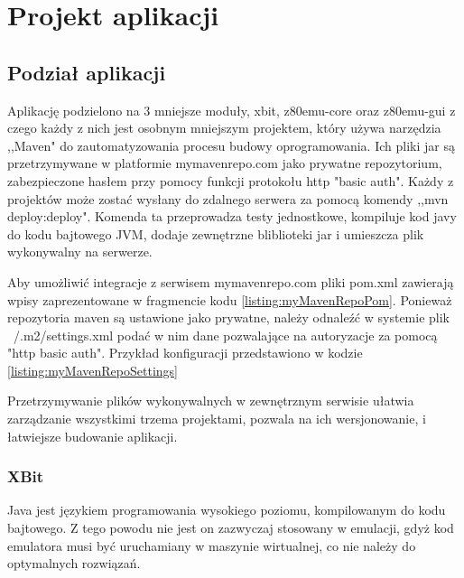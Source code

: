 \chapter{Projekt aplikacji}
	
	\section{Podział aplikacji}
	Aplikację podzielono na 3 mniejsze moduły, xbit, z80emu-core oraz z80emu-gui z czego każdy z nich jest osobnym mniejszym projektem, który używa narzędzia ,,Maven" do zautomatyzowania procesu budowy oprogramowania. Ich pliki jar są przetrzymywane w platformie mymavenrepo.com jako prywatne repozytorium, zabezpieczone hasłem przy pomocy funkcji protokołu http "basic auth". Każdy z projektów może zostać wysłany do zdalnego serwera za pomocą komendy ,,mvn deploy:deploy". Komenda ta przeprowadza testy jednostkowe, kompiluje kod javy do kodu bajtowego JVM, dodaje zewnętrzne bliblioteki jar i umieszcza plik wykonywalny na serwerze.
	
	Aby umożliwić integracje z serwisem mymavenrepo.com pliki pom.xml zawierają wpisy zaprezentowane w fragmencie kodu \ref{listing:myMavenRepoPom}. Ponieważ repozytoria maven są ustawione jako prywatne, należy odnaleźć w systemie plik ~/.m2/settings.xml podać w nim dane pozwalające na autoryzacje za pomocą "http basic auth". Przykład konfiguracji przedstawiono w kodzie \ref{listing:myMavenRepoSettings}
	
	
	
	
	
	Przetrzymywanie plików wykonywalnych w zewnętrznym serwisie ułatwia zarządzanie wszystkimi trzema projektami, pozwala na ich wersjonowanie, i łatwiejsze budowanie aplikacji. 

	\subsection{XBit}
	Java jest językiem programowania wysokiego poziomu, kompilowanym do kodu bajtowego. Z tego powodu nie jest on zazwyczaj stosowany w emulacji, gdyż kod emulatora musi być uruchamiany w maszynie wirtualnej, co nie należy do optymalnych rozwiązań.
	
